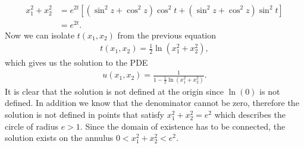 \begin{questions}
\begin{solution}
\begin{align*}
\end{align*}
\begin{align*}
x_1^2+x_2^2&=e^{2t}\left[\left(\sin^2{z}+\cos^2{z}\right)\cos^2{t}+\left(\sin^2{z}+\cos^2{z}\right)\sin^2{t}\right]\\
&=e^{2t}.
\end{align*}
Now we can isolate $t(x_1,x_2)$ from the previous equation
\begin{align*}
t(x_1,x_2)=\frac{1}{2}\ln\left(x_1^2+x_2^2\right),
\end{align*}
which gives us the solution to the PDE
\begin{align*}
u(x_1,x_2)=\frac{1}{1-\frac{1}{2}\ln\left(x_1^2+x_2^2\right)}.
\end{align*}
It is clear that the solution is not defined at the origin since $\ln{(0)}$ is not defined. In addition we know that the denominator cannot be zero, therefore the solution is not defined in points that satisfy $x_1^2+x_2^2=e^2$ which describes the circle of radius $e>1$. Since the domain of existence has to be connected, the solution exists on the annulus $0<x_1^2+x_2^2<e^2$.
\end{solution}
\end{questions}